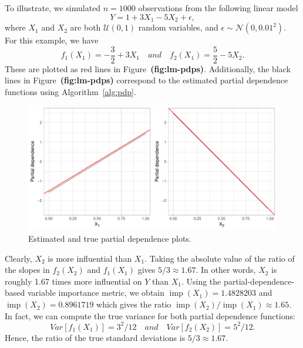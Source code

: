 \documentclass[12pt]{article}
\def\ref#1{\textbf{(#1)}}
\DeclareMathOperator{\imp}{imp}
\begin{document}
To illustrate, we simulated $n = 1000$ observations from the following linear model
\begin{equation*}
  Y = 1 + 3 X_1 - 5 X_2 + \epsilon,
\end{equation*}
where $X_1$ and $X_2$ are both $\mathcal{U}\left(0, 1\right)$ random variables, and $\epsilon \sim \mathcal{N}\left(0, 0.01 ^ 2\right)$. For this example, we have 
\begin{equation*}
  f_1\left(X_1\right) = -\frac{3}{2} + 3 X_1 \quad and \quad f_2\left(X_1\right) = \frac{5}{2} - 5 X_2.
\end{equation*}
These are plotted as red lines in Figure~\ref{fig:lm-pdps}. Additionally, the black lines in Figure~\ref{fig:lm-pdps} correspond to the estimated partial dependence functions using Algorithm~\eqref{alg:pdp}.

\begin{figure}[!htb]
  \centering
  \includegraphics[width=1.0\textwidth]{lm-pdps}
  \caption{Estimated and true partial dependence plots. \label{fig:lm-pdps}}
\end{figure}

Clearly, $X_2$ is more influential than $X_1$. Taking the absolute value of the ratio of the slopes in $f_2\left(X_2\right)$ and $f_1\left(X_1\right)$ gives $5 / 3 \approx 1.67$. In other words, $X_2$ is roughly 1.67 times more influential on $Y$ than $X_1$. Using the partial-dependence-based variable importance metric, we obtain $\imp\left(X_1\right) = 1.4828203$ and $\imp\left(X_2\right) = 0.8961719$ which gives the ratio $\imp\left(X_2\right) / \imp\left(X_1\right) \approx 1.65$. In fact, we can compute the true variance for both partial dependence functions:
\begin{equation*}
Var\left[f_1\left(X_1\right)\right] = 3^2 / 12 \quad and \quad Var\left[f_2\left(X_2\right)\right] = 5^2 / 12.
\end{equation*}
Hence, the ratio of the true standard deviations is $5 / 3 \approx 1.67$.
\end{document}
